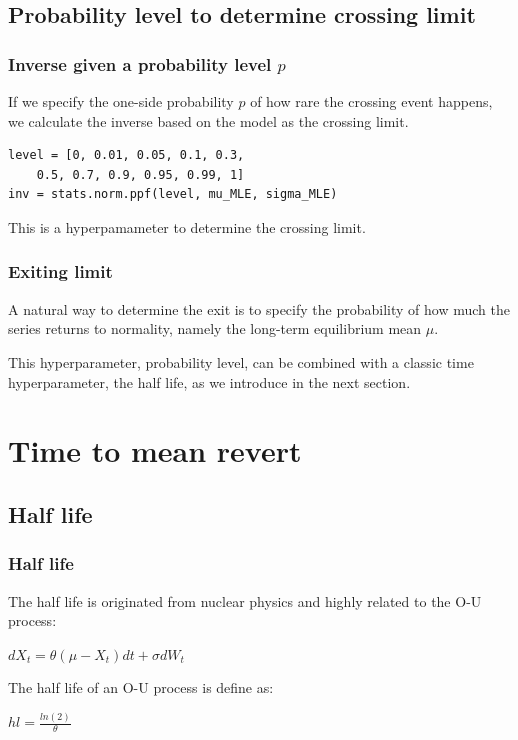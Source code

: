 \documentclass[11pt]{beamer}
\begin{document}
\subsection*{Probability level to determine crossing limit}
\begin{frame}[fragile]
\frametitle{Inverse given a probability level $p$}
If we specify the one-side probability $p$ of how rare the crossing event happens, we calculate the inverse based on the model as the crossing limit.
\begin{verbatim}
level = [0, 0.01, 0.05, 0.1, 0.3, 
	0.5, 0.7, 0.9, 0.95, 0.99, 1]
inv = stats.norm.ppf(level, mu_MLE, sigma_MLE)
\end{verbatim}
This is a hyperpamameter to determine the crossing limit.
\end{frame}

\begin{frame}
\frametitle{Exiting limit}
A natural way to determine the exit is to specify the probability of how much the series returns to normality, namely the long-term equilibrium mean $\mu$. 

This hyperparameter, probability level, can be combined with a classic time hyperparameter, the half life, as we introduce in the next section.
\end{frame}

\section*{Time to mean revert}
\subsection*{Half life}
\begin{frame}
\frametitle{Half life}
The half life is originated from nuclear physics and highly related to the O-U process:
\begin{center}
	$dX_t =\theta (\mu - X_t)dt + \sigma dW_t$
\end{center}
The half life of an O-U process is define as:
\begin{center}
$hl=\frac{ln(2)}{\theta}$
\end{center}
\end{frame}
\end{document}
